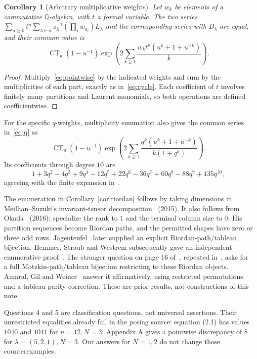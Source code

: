 \documentclass[11pt]{article}
\newcommand{\CT}{\operatorname{CT}}
\newtheorem{corollary}[theorem]{Corollary}
\begin{document}
\begin{corollary}[Arbitrary multiplicative weights]\label{cor:weights}
Let $w_k$ be elements of a commutative $\mathbb Q$-algebra, with $t$ a
formal variable. The two series
$\sum_{n\geq0}t^n\sum_{\lambda\vdash n}z_\lambda^{-1}
 (\prod_iw_{a_i})L_\lambda$ and the corresponding series with $B_\lambda$
are equal, and their common value is
\[
 \CT_u(1-u^{-1})\exp\!\left(
 2\sum_{k\geq1}\frac{w_k t^k(u^k+1+u^{-k})}{k}\right).
\]
\end{corollary}
\begin{proof}
Multiply~\eqref{eq:pointwise} by the indicated weights and sum by the
multiplicities of each part, exactly as in~\eqref{eq:cycle}.
Each coefficient of $t$ involves finitely many partitions and Laurent
monomials, so both operations are defined coefficientwise.
\end{proof}

For the specific $q$-weights, multiplicity summation also gives the common
series in~\eqref{eq:q} as
\[
 \CT_u(1-u^{-1})\exp\!\left(
 2\sum_{k\geq1}\frac{q^k(u^k+1+u^{-k})}{k(1+q^k)}\right).
\]
Its coefficients through degree $10$ are
\[
 1+3q^2-4q^3+9q^4-12q^5+22q^6-36q^7+60q^8-88q^9+135q^{10},
\]
agreeing with the finite expansion in~\cite[p.~16]{HSW}.

The enumeration in Corollary~\ref{cor:riordan} follows by taking dimensions
in Meilhan--Suzuki's invariant-tensor decomposition~\cite[Lemma 3.7]{MS}
(2015). It also follows from Okada~\cite[Corollary 5.5(3)]{O} (2016):
specialize the rank to $1$ and the
terminal column size to $0$. His partition sequences become Riordan
paths, and the permitted shapes have zero or three odd rows.
Jagenteufel~\cite[Section 3.2.1 and Lemma 36]{J} later supplied an explicit
Riordan-path/tableau bijection. Hemmer, Straub and Westrem subsequently
gave an independent enumerative proof~\cite[Theorem 11]{HSW}.
The stronger question on page 16 of~\cite{HSW}, repeated in~\cite{K},
asks for a full Motzkin-path/tableau bijection restricting to these Riordan
objects. Amaral, Gil and Weiner~\cite[Theorems 2.1, 3.7 and 4.1]{AGW}
answer it affirmatively, using restricted permutations and a tableau
parity correction. These are prior results, not constructions of this note.

Questions 4 and 5 are classification questions, not universal assertions.
Their unrestricted equalities already fail in the posing source: equation
(2.1) has values $1040$ and $1041$ for $n=12,N=3$; Appendix A gives a
pointwise discrepancy of $8$ for $\lambda=(5,2,1),N=3$.
Our answers for $N=1,2$ do not change those counterexamples.
\end{document}
